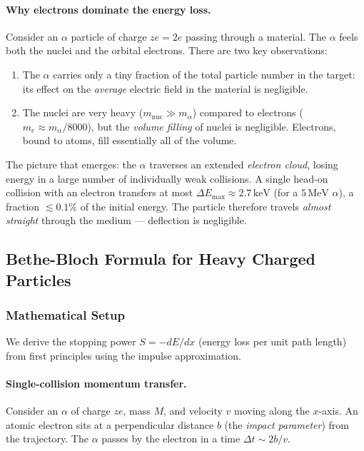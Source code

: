 \paragraph{Why electrons dominate the energy loss.}
Consider an $\alpha$ particle of charge $ze=2e$ passing through a material.
The $\alpha$ feels both the nuclei and the orbital electrons.  There are two key
observations:
\begin{enumerate}
  \item The $\alpha$ carries only a tiny fraction of the total particle number
  in the target: its effect on the \emph{average} electric field in the material is
  negligible.
  \item The nuclei are very heavy ($m_\text{nuc}\gg m_\alpha$) compared to electrons
  ($m_e \approx m_\alpha/8000$), but the \emph{volume filling} of nuclei is
  negligible.  Electrons, bound to atoms, fill essentially all of the volume.
\end{enumerate}
The picture that emerges: the $\alpha$ traverses an extended \emph{electron cloud},
losing energy in a large number of individually weak collisions.  A single
head-on collision with an electron transfers at most $\Delta E_\text{max} \approx
2.7\,\text{keV}$ (for a $5\,\text{MeV}$ $\alpha$), a fraction $\lesssim 0.1\%$
of the initial energy.  The particle therefore travels \emph{almost straight}
through the medium — deflection is negligible.

\subsection{Bethe-Bloch Formula for Heavy Charged Particles}
\label{subsec:lec06:bethe_bloch}

\subsubsection*{Mathematical Setup}
We derive the stopping power $S = -dE/dx$ (energy loss per unit path length)
from first principles using the impulse approximation.

\paragraph{Single-collision momentum transfer.}
Consider an $\alpha$ of charge $ze$, mass $M$, and velocity $v$ moving along the
$x$-axis.  An atomic electron sits at a perpendicular distance $b$ (the
\emph{impact parameter}) from the trajectory.  The $\alpha$ passes by the electron in
a time $\Delta t \sim 2b/v$.

